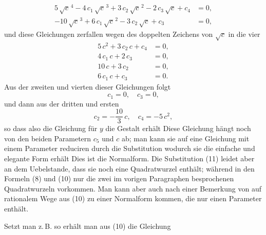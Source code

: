 \[
\begin{aligned}
5\,\sqrt{c}^{\,4} - 4\,c_1\,\sqrt{c}^{\,3} + 3\,c_2\,\sqrt{c}^{\,2} - 2\,c_3\,\sqrt{c} + c_4 &= 0,\\
-10\,\sqrt{c}^{\,3} + 6\,c_1\,\sqrt{c}^{\,2} - 3\,c_2\,\sqrt{c} + c_3 &= 0,
\end{aligned}
\]
und diese Gleichungen zerfallen wegen des doppelten Zeichens von $\sqrt{c}$ in die vier
\[
\begin{aligned}
5\,c^2 + 3\,c_2\,c + c_4 &= 0,\\
4\,c_1\,c + 2\,c_3 &= 0,\\
10\,c + 3\,c_2 &= 0,\\
6\,c_1\,c + c_3 &= 0.
\end{aligned}
\]
Aus der zweiten und vierten dieser Gleichungen folgt
\[
c_1 = 0, \quad c_3 = 0,
\]
und dann aus der dritten und ersten
\[
c_2 = -\frac{10}{3}\,c, \quad c_4 = -5\,c^2,
\]
so dass also die Gleichung f\"ur $y$ die Gestalt erh\"alt
Diese Gleichung h\"angt noch von den beiden Parametern $c_5$ und $c$ ab; man kann sie auf eine Gleichung mit einem Parameter reduciren durch die Substitution
wodurch sie die einfache und elegante Form erh\"alt
Dies ist die  Normalform. Die Substitution (11) leidet aber an dem Uebelstande, dass sie noch eine Quadratwurzel enth\"alt; w\"ahrend in den Formeln (8) und (10) nur die zwei im vorigen Paragraphen besprochenen Quadratwurzeln vorkommen. Man kann aber auch nach einer Bemerkung von  auf rationalem Wege aus (10) zu einer Normalform kommen, die nur einen Parameter enth\"alt.

Setzt man z.\,B.
so erh\"alt man aus (10) die Gleichung

